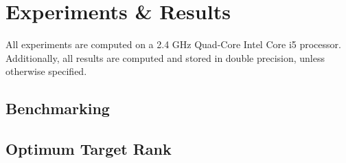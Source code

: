 \chapter{Experiments \& Results}\label{chpt:3}
All experiments are computed on a 2.4 GHz Quad-Core Intel Core i5 processor.
Additionally, all results are computed and stored in double precision, unless
otherwise specified.

\section{Benchmarking}\label{sec:3_1_benchmarking}

\section{Optimum Target Rank}\label{sec:3_2_svd_params}
